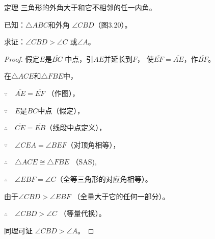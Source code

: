 \begin{Theorem}{定理}
 三角形的外角大于和它不相邻的任一内角。
\end{Theorem}

\begin{figure}
    \begin{minipage}[t]{0.48\linewidth}
    \centering
{}
    \caption{}
    \end{minipage}
    \begin{minipage}[t]{0.48\linewidth}
    \centering
    \caption{}
    \end{minipage}
    \end{figure}

已知：$\triangle ABC$和外角
$\angle CBD$（图3.20）。

求证：$\angle CBD>\angle C$
或$\angle A$。

\begin{proof}
    假定$E$是$\overline{BC}$
中点，引$AE$并延长到$F$，
使$\overline{EF}=\overline{AE}$，作$\overline{BF}$。

在$\triangle ACE$和$\triangle FBE$中，

$\because\quad \overline{AE}=\overline{EF}$ （作图），

$\because\quad E$是$\overline{BC}$中点（假定），

$\therefore\quad \overline{CE}=\overline{EB}$（线段中点定义），

$\because\quad \angle CEA=\angle BEF$（对顶角相等），

$\therefore\quad \triangle ACE\cong \triangle FBE$ （SAS),

$\therefore\quad \angle EBF=\angle C$（全等三角形的对应角相等）。

由于$\angle CBD>\angle EBF$ （全量大于它的任何一部分）。

$\therefore\quad \angle CBD>\angle C$ （等量代换）。

同理可证 $\angle CBD> \angle A$。
\end{proof}

